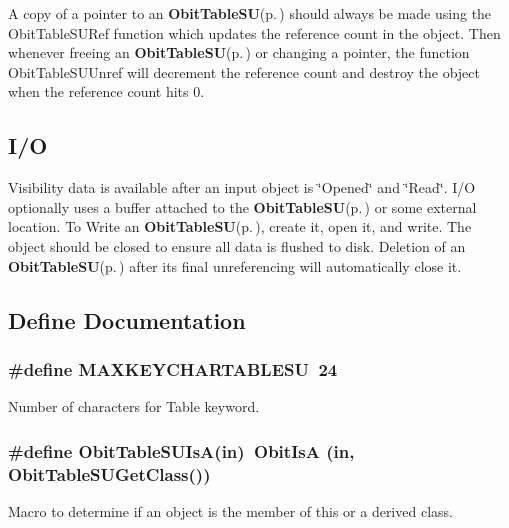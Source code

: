 A copy of a pointer to an {\bf Obit\-Table\-SU}{\rm (p.\,\pageref{structObitTableSU})} should always be made using the Obit\-Table\-SURef function which updates the reference count in the object. Then whenever freeing an {\bf Obit\-Table\-SU}{\rm (p.\,\pageref{structObitTableSU})} or changing a pointer, the function Obit\-Table\-SUUnref will decrement the reference count and destroy the object when the reference count hits 0.\subsection{I/O}\label{ObitTableSU_8h_ObitTableSUUsage}
Visibility data is available after an input object is \char`\"{}Opened\char`\"{} and \char`\"{}Read\char`\"{}. I/O optionally uses a buffer attached to the {\bf Obit\-Table\-SU}{\rm (p.\,\pageref{structObitTableSU})} or some external location. To Write an {\bf Obit\-Table\-SU}{\rm (p.\,\pageref{structObitTableSU})}, create it, open it, and write. The object should be closed to ensure all data is flushed to disk. Deletion of an {\bf Obit\-Table\-SU}{\rm (p.\,\pageref{structObitTableSU})} after its final unreferencing will automatically close it.

\subsection{Define Documentation}
\subsubsection{\setlength{\rightskip}{0pt plus 5cm}\#define MAXKEYCHARTABLESU\ 24}\label{ObitTableSU_8h_a0}


Number of characters for Table keyword. 

\subsubsection{\setlength{\rightskip}{0pt plus 5cm}\#define Obit\-Table\-SUIs\-A(in)\ Obit\-Is\-A (in, Obit\-Table\-SUGet\-Class())}\label{ObitTableSU_8h_a3}


Macro to determine if an object is the member of this or a derived class. 

